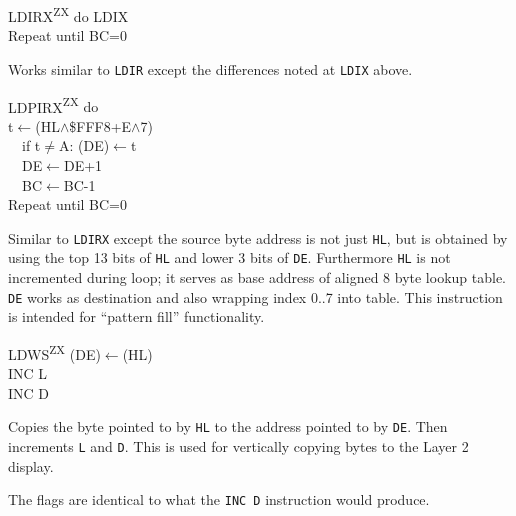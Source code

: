 \documentclass[twoside,openright,a4paper]{book}
\newcommand{\ZXN}{\textnormal{\textsuperscript{ZX}}}
\begin{document}
\begin{basedescript}{
	\desclabelstyle{\multilinelabel}
	\desclabelwidth{3cm}}
	\pagebreak
	\begin{detailitem}{LDIRX\ZXN}
		{do LDIX\\
		Repeat until BC=0}

		Works similar to {\tt LDIR} except the differences noted at {\tt LDIX} above.

		\DetailNoEffect
				
		\begin{DetailTiming}
		\end{DetailTiming}

	\end{detailitem}

	\begin{detailitem}{LDPIRX\ZXN}
		{do\\
		t$\leftarrow$(HL$\wedge$\$FFF8+E$\wedge$7)\\
		~~if t$\neq$A: (DE)$\leftarrow$t\\
		~~DE$\leftarrow$DE+1\\
		~~BC$\leftarrow$BC-1\\
		Repeat until BC=0}

		Similar to {\tt LDIRX} except the source byte address is not just {\tt HL}, but is obtained by using the top 13 bits of {\tt HL} and lower 3 bits of {\tt DE}. Furthermore {\tt HL} is not incremented during loop; it serves as base address of aligned 8 byte lookup table. {\tt DE} works as destination and also wrapping index 0..7 into table. This instruction is intended for ``pattern fill'' functionality.

		\DetailNoEffect
				
		\begin{DetailTiming}
			\DetailTime{BC=0}{4}{16}
			\DetailTime{BC$\not=$0}{5}{21}
		\end{DetailTiming}

	\end{detailitem}
	
	\begin{detailitem}{LDWS\ZXN}
		{(DE)$\leftarrow$(HL)\\
		INC L\\
		INC D}

		Copies the byte pointed to by {\tt HL} to the address pointed to by {\tt DE}. Then increments {\tt L} and {\tt D}. This is used for vertically copying bytes to the Layer 2 display.
		
		The flags are identical to what the {\tt INC D} instruction would produce.
			

\end{detailitem}
\end{basedescript}
\end{document}
